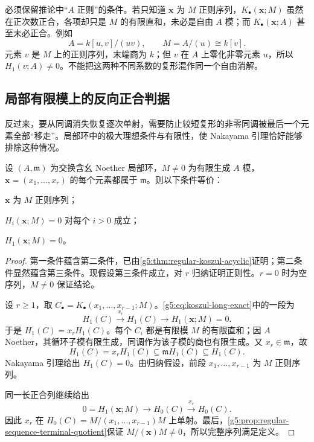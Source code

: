 必须保留推论中“\(A\) 正则”的条件。若只知道 \(\mathbf x\) 为 \(M\) 正则序列，\(K_\bullet(\mathbf x;M)\) 虽然在正次数正合，各项却只是 \(M\) 的有限直和，未必是自由 \(A\) 模；而 \(K_\bullet(\mathbf x;A)\) 甚至未必正合。例如
\[
	A=k[u,v]/(uv),\qquad M=A/(u)\cong k[v].
\]
元素 \(v\) 是 \(M\) 上的正则序列，末端商为 \(k\)；但 \(v\) 在 \(A\) 上零化非零元素 \(u\)，所以 \(H_1(v;A)\ne0\)。不能把这两种不同系数的复形混作同一个自由消解。

\subsection{局部有限模上的反向正合判据}
\label{g5:subsec:0802:04}

反过来，要从同调消失恢复逐次单射，需要防止较短复形的非零同调被最后一个元素全部“移走”。局部环中的极大理想条件与有限性，使 Nakayama 引理恰好能够排除这种情况。

\begin{theorem}\label{g5:thm:koszul-regularity-criterion}
	设 \((A,\mathfrak m)\) 为交换含幺 Noether 局部环，\(M\ne0\) 为有限生成 \(A\) 模，\(\mathbf x=(x_1,\ldots,x_r)\) 的每个元素都属于 \(\mathfrak m\)。则以下条件等价：
	\begin{equivalences}
		\item \(\mathbf x\) 为 \(M\) 正则序列；
		\item \(H_i(\mathbf x;M)=0\) 对每个 \(i>0\) 成立；
		\item \(H_1(\mathbf x;M)=0\)。
	\end{equivalences}
\end{theorem}
\begin{proof}
	第一条件蕴含第二条件，已由\cref{g5:thm:regular-koszul-acyclic}证明；第二条件显然蕴含第三条件。现假设第三条件成立，对 \(r\) 归纳证明正则性。\(r=0\) 时为空序列，\(M\ne0\) 保证结论。

	设 \(r\geq1\)，取 \(C_\bullet=K_\bullet(x_1,\ldots,x_{r-1};M)\)。\eqref{g5:eq:koszul-long-exact}中的一段为
	\[
		H_1(C)\xrightarrow{x_r}H_1(C)
		\longrightarrow H_1(\mathbf x;M)=0.
	\]
	于是 \(H_1(C)=x_rH_1(C)\)。每个 \(C_i\) 都是有限模 \(M\) 的有限直和；因 \(A\) Noether，其循环子模有限生成，同调作为该子模的商也有限生成。又 \(x_r\in\mathfrak m\)，故
	\[
		H_1(C)=x_rH_1(C)\subseteq\mathfrak mH_1(C)\subseteq H_1(C).
	\]
	Nakayama 引理给出 \(H_1(C)=0\)。由归纳假设，前段 \(x_1,\ldots,x_{r-1}\) 为 \(M\) 正则序列。

	同一长正合列继续给出
	\[
		0=H_1(\mathbf x;M)\longrightarrow
		H_0(C)\xrightarrow{x_r}H_0(C).
	\]
	因此 \(x_r\) 在 \(H_0(C)=M/(x_1,\ldots,x_{r-1})M\) 上单射。最后，\cref{g5:prop:regular-sequence-terminal-quotient}保证 \(M/(\mathbf x)M\ne0\)，所以完整序列满足定义。
\end{proof}

